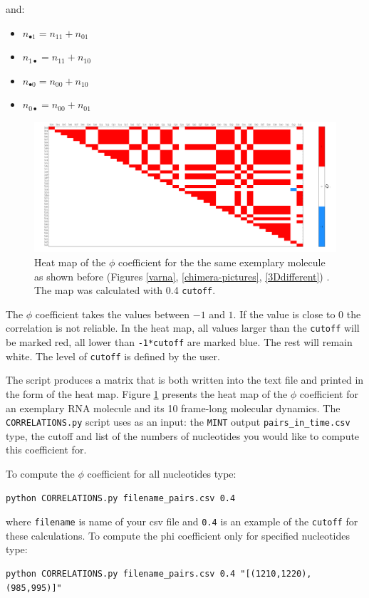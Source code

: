 \documentclass[12pt]{article}
\begin{document}
and:
\begin{itemize}
\item $n_{\bullet1} = n_{11}+n_{01}$
\item $n_{1\bullet} = n_{11}+n_{10}$
\item $n_{\bullet0} = n_{00}+n_{10}$
\item $n_{0\bullet} = n_{00}+n_{01}$
\end{itemize}

\begin{figure}[h!]
\centering
\includegraphics[scale=0.15]{./pictures/correlation_matrix.png}
\caption{Heat map of the $\phi$ coefficient for the the same exemplary molecule as shown before (Figures \ref{varna}, \ref{chimera-pictures}, \ref{3Ddifferent}) . The map was calculated with 0.4 {\tt cutoff}.}
\label{coefficientFigure}
\end{figure}

The $\phi$ coefficient takes the values between $-1$ and $1$. If the value is close to $0$ the correlation is not reliable. In the heat map, all values larger than the {\tt cutoff} will be marked red, all lower than {\tt -1*cutoff} are marked blue. The rest will remain white. The level of {\tt cutoff} is defined by the user.

The script produces a matrix that is both written into the text file and printed in the form of the heat map. Figure \ref{coefficientFigure} presents the heat map of the $\phi$ coefficient for an exemplary RNA molecule and its 10 frame-long molecular dynamics. The {\tt CORRELATIONS.py} script uses as an input: the {\tt MINT} output {\tt pairs\_in\_time.csv} type, the cutoff and list of the numbers of nucleotides you would like to compute this coefficient for.

To compute the $\phi$ coefficient for all nucleotides type:
\begin{verbatim}
python CORRELATIONS.py filename_pairs.csv 0.4
\end{verbatim}
where {\tt filename} is name of your csv file and {\tt 0.4} is an example of the {\tt cutoff} for these calculations.
To compute the phi coefficient only for specified nucleotides type:\\
\begin{verbatim}
python CORRELATIONS.py filename_pairs.csv 0.4 "[(1210,1220),(985,995)]" 
\end{verbatim}
\end{document}
